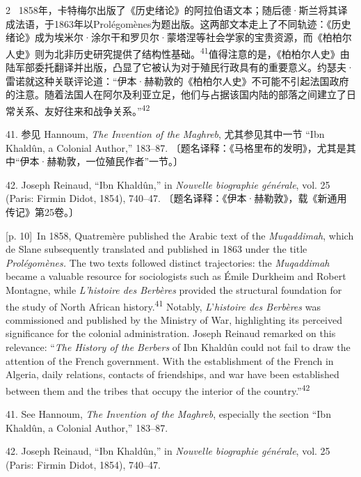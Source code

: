 \documentclass[10pt,a4paper]{article}
\begin{document}
\begin{paracol}{2}
\switchcolumn*
{\scriptsize\color{gray} [p. 10]}\ 1858年，卡特梅尔出版了《历史绪论》的阿拉伯语文本；随后德·斯兰将其译成法语，于1863年以Prolégomènes为题出版。这两部文本走上了不同轨迹：《历史绪论》成为埃米尔·涂尔干和罗贝尔·蒙塔涅等社会学家的宝贵资源，而《柏柏尔人史》则为北非历史研究提供了结构性基\mbox{础。\textsuperscript{41}}值得注意的是，《柏柏尔人史》由陆军部委托翻译并出版，凸显了它被认为对于殖民行政具有的重要意义。约瑟夫·雷诺就这种关联评论道：“伊本·赫勒敦的《柏柏尔人史》不可能不引起法国政府的注意。随着法国人在阿尔及利亚立足，他们与占据该国内陆的部落之间建立了日常关系、友好往来和战争关系。”\nobreak\textsuperscript{42}\par{\small 41. 参见 Hannoum, \textit{The Invention of the Maghreb}, 尤其参见其中一节 “Ibn Khaldûn, a Colonial Author,” 183–87. 〔题名译释：《马格里布的发明》，尤其是其中“伊本·赫勒敦，一位殖民作者”一节。〕\par}{\small 42. Joseph Reinaud, “Ibn Khaldûn,” in \textit{Nouvelle biographie générale}, vol. 25 (Paris: Firmin Didot, 1854), 740–47. 〔题名译释：《伊本·赫勒敦》，载《新通用传记》第25卷。〕\par}
\switchcolumn
{\scriptsize\color{gray} [p. 10]}\ In 1858, Quatremère published the Arabic text of the \textit{Muqaddimah}, which de Slane subsequently translated and published in 1863 under the title \textit{Prolégomènes.} The two texts followed distinct trajectories: the \textit{Muqaddimah} became a valuable resource for sociologists such as Émile Durkheim and Robert Montagne, while \textit{L’histoire des Berbères} provided the structural foundation for the study of North African history.\nobreak\textsuperscript{41} Notably, \textit{L}’\textit{histoire des Berbères} was commissioned and published by the Ministry of War, highlighting its perceived significance for the colonial administration. Joseph Reinaud remarked on this relevance: “\textit{The History of the Berbers} of Ibn Khaldûn could not fail to draw the attention of the French government. With the establishment of the French in Algeria, daily relations, contacts of friendships, and war have been established between them and the tribes that occupy the interior of the country.”\nobreak\textsuperscript{42}\par{\small 41. See Hannoum, \textit{The Invention of the Maghreb}, especially the section “Ibn Khaldûn, a Colonial Author,” 183–87.\par}{\small 42. Joseph Reinaud, “Ibn Khaldûn,” in \textit{Nouvelle biographie générale}, vol. 25 (Paris: Firmin Didot, 1854), 740–47.\par}

\end{paracol}
\end{document}
